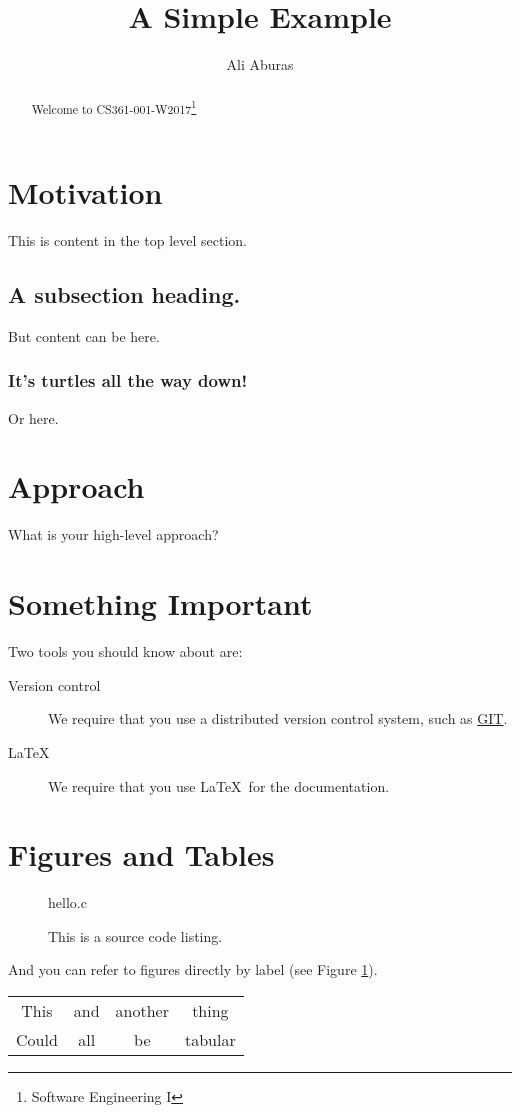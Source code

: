 \documentclass[letterpaper,12pt,titlepage]{article}
\title{A Simple Example}
\author{Ali Aburas}
\begin{document}
\maketitle

\begin{abstract}
	Welcome to CS361-001-W2017\footnote{Software Engineering I}
\end{abstract}


\tableofcontents

\section{Motivation}
This is content in the top level section.
\subsection{A subsection heading.}
But content can be here.
\subsubsection{It's turtles all the way down!}
Or here.
\section{Approach}
What is your high-level approach?

\section{Something Important}
Two tools you should know about are:
\begin{description}
	\item[Version control]
		We require that you use a distributed version control system, such as \href{https://git-scm.com/}{GIT}.
	\item[LaTeX]
		We require that you use \LaTeX\ for the documentation.
	\end{description}


\section{Figures and Tables}
\begin{figure}[h]
	 {hello.c}
	\caption{This is a source code listing.}
	\label{fig:hello.c}
\end{figure}

And you can refer to figures directly by label (see Figure \ref{fig:hello.c}).

\begin{table}[h]
	\begin{tabular}{c|c|cc}
		This & and & another & thing\\
		Could & all & be & tabular\\
	\end{tabular}
\end{table}
\end{document}

